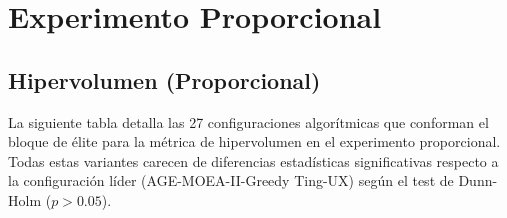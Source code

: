 \section{Experimento Proporcional}

\subsection{Hipervolumen (Proporcional)}\label{anexo:elite_hv_prop}

La siguiente tabla detalla las 27 configuraciones algorítmicas que conforman el bloque de élite para la métrica de hipervolumen en el experimento proporcional. Todas estas variantes carecen de diferencias estadísticas significativas respecto a la configuración líder (AGE-MOEA-II-Greedy Ting-UX) según el test de Dunn-Holm ($p > 0.05$).

